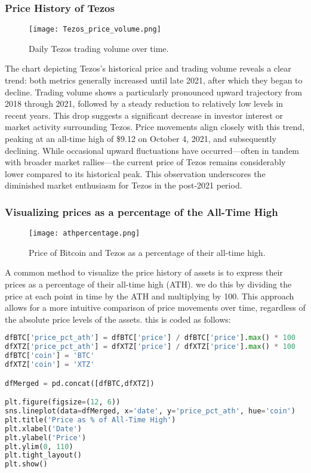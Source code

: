 \subsubsection{Price History of Tezos}
\label{sec:xtz-pricehistory}
\begin{figure}[H]
    \centering
    \texttt{[image: Tezos\_price\_volume.png]}
    \caption{Daily Tezos trading volume over time.}
    \label{fig:xtz-volume}
\end{figure}
The chart depicting Tezos's historical price and trading volume reveals a clear trend: both metrics generally increased until late 2021, after which they began to decline.
 Trading volume shows a particularly pronounced upward trajectory from 2018 through 2021, followed by a steady reduction to relatively low levels in recent years.
  This drop suggests a significant decrease in investor interest or market activity surrounding Tezos.
   Price movements align closely with this trend, peaking at an all-time high of \$9.12 on October 4, 2021, and subsequently declining.
    While occasional upward fluctuations have occurred—often in tandem with broader market rallies—the current price of Tezos remains considerably lower compared to its historical peak. 
    This observation underscores the diminished market enthusiasm for Tezos in the post-2021 period.

\subsubsection{Visualizing prices as a percentage of the All-Time High}
\label{sec:pricehistory-ATH}
\begin{figure}[H]
    \centering
    \texttt{[image: athpercentage.png]}
    \caption{Price of Bitcoin and Tezos as a percentage of their all-time high.}
    \label{fig:athpercentage}
\end{figure}

A common method to visualize the price history of assets is to express their prices as a percentage of their all-time high (ATH). we do this by dividing the price at each point in time by the ATH and multiplying by 100. This approach allows for a more intuitive comparison of price movements over time, regardless of the absolute price levels of the assets.
this is coded as follows:
\begin{lstlisting}[language=Python, caption={Price as a percentage of the all-time high}, label={lst:athpercentage-code}]
    dfBTC['price_pct_ath'] = dfBTC['price'] / dfBTC['price'].max() * 100
dfXTZ['price_pct_ath'] = dfXTZ['price'] / dfXTZ['price'].max() * 100
dfBTC['coin'] = 'BTC'
dfXTZ['coin'] = 'XTZ'

dfMerged = pd.concat([dfBTC,dfXTZ])

plt.figure(figsize=(12, 6))
sns.lineplot(data=dfMerged, x='date', y='price_pct_ath', hue='coin')
plt.title('Price as % of All-Time High')
plt.xlabel('Date')
plt.ylabel('Price')
plt.ylim(0, 110)
plt.tight_layout()
plt.show()
\end{lstlisting}

